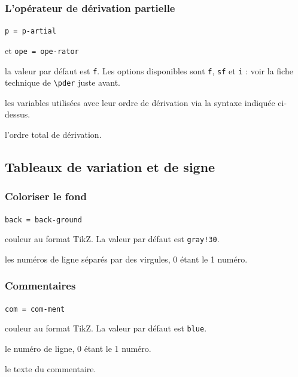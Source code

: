 \documentclass[12pt,a4paper]{book}
\newcommand\env[1]{\texttt{#1}}
\newcommand\macro[1]{\env{\textbackslash{}#1}}
\theoremstyle{definition}
\newcommand\mwhyprefix[2]{%
	\texttt{#1 = #1-#2}%
}
\begin{document}
{{\subsubsection{L'opérateur de dérivation partielle} 



 \hfill \mwhyprefix{p}{artial}
                            et \mwhyprefix{ope}{rator}

\IDoption{} la valeur par défaut est \verb+f+. Les options disponibles sont \verb+f+, \verb+sf+ et \verb+i+ : voir la fiche technique de \macro{pder} juste avant.

 les variables utilisées avec leur ordre de dérivation via la syntaxe indiquée ci-dessus.

 l'ordre total de dérivation.











\subsection{Tableaux de variation et de signe}



\subsubsection{Coloriser le fond}

 \hfill \mwhyprefix{back}{ground}


\IDoption{} couleur au format TikZ.
            La valeur par défaut est \verb+gray!30+.


 les numéros de ligne séparés par des virgules, $0$ étant le 1\ier{} numéro.




\subsubsection{Commentaires}

 \hfill \mwhyprefix{com}{ment}


\IDoption{} couleur au format TikZ.
            La valeur par défaut est \verb+blue+.


 le numéro de ligne, $0$ étant le 1\ier{} numéro.

 le texte du commentaire.


}}
\end{document}
